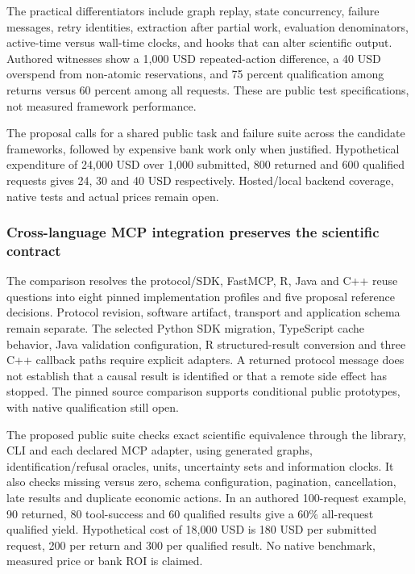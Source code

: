 The practical differentiators include graph replay, state concurrency,
failure messages, retry identities, extraction after partial work,
evaluation denominators, active-time versus wall-time clocks, and hooks
that can alter scientific output. Authored witnesses show a 1,000 USD
repeated-action difference, a 40 USD overspend from non-atomic
reservations, and 75 percent qualification among returns versus 60
percent among all requests. These are public test specifications, not
measured framework performance. \citep{exec24_framework_contracts}

The proposal calls for a shared public task and failure suite across the
candidate frameworks, followed by expensive bank work only when
justified. Hypothetical expenditure of 24,000 USD over 1,000 submitted,
800 returned and 600 qualified requests gives 24, 30 and 40 USD
respectively. Hosted/local backend coverage, native tests and actual
prices remain open. \citep{exec24_framework_contracts}

\hypertarget{cross-language-mcp-integration-preserves-the-scientific-contract}{%
\subsubsection{Cross-language MCP integration preserves the scientific
contract}\label{cross-language-mcp-integration-preserves-the-scientific-contract}}

The comparison resolves the protocol/SDK, FastMCP, R, Java and C++ reuse
questions into eight pinned implementation profiles and five proposal
reference decisions. Protocol revision, software artifact, transport and
application schema remain separate. The selected Python SDK migration,
TypeScript cache behavior, Java validation configuration, R
structured-result conversion and three C++ callback paths require
explicit adapters. A returned protocol message does not establish that a
causal result is identified or that a remote side effect has stopped.
The pinned source comparison supports conditional public prototypes,
with native qualification still open.
\citep{exec24_mcp_python,exec24_mcp_java,exec24_mcp_r}

The proposed public suite checks exact scientific equivalence through
the library, CLI and each declared MCP adapter, using generated graphs,
identification/refusal oracles, units, uncertainty sets and information
clocks. It also checks missing versus zero, schema configuration,
pagination, cancellation, late results and duplicate economic actions.
In an authored 100-request example, 90 returned, 80 tool-success and 60
qualified results give a 60\% all-request qualified yield. Hypothetical
cost of 18,000 USD is 180 USD per submitted request, 200 per return and
300 per qualified result. No native benchmark, measured price or bank
ROI is claimed. \citep{exec24_mcp_contracts}

